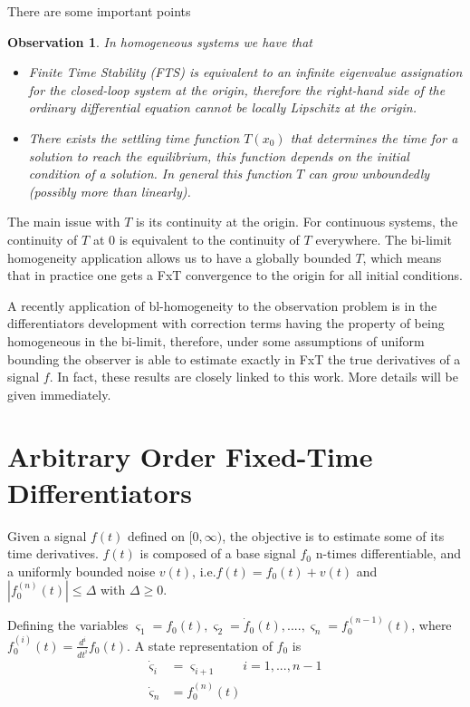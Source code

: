\documentclass[11pt,letterpaper,twoside,openright]{report}
\newtheorem{observation}{Observation}[chapter]
\begin{document}
There are some important points 
\begin{observation}\label{obs: Sys Homogeneous}
	In homogeneous systems we have that
\begin{itemize}
	\item Finite Time Stability (FTS) is equivalent to an infinite eigenvalue assignation for the closed-loop system at the origin, therefore the right-hand side of the ordinary differential equation cannot be locally Lipschitz at the origin.
	\item There exists the settling time function $T(x_0)$ that determines the time for a solution to reach the equilibrium, this function depends on the initial condition of a solution. In general this function $T$ can grow unboundedly (possibly more than linearly).
\end{itemize}
\end{observation}

The main issue with $T$ is its continuity at the origin. For continuous systems, the continuity of $T$ at $0$ is equivalent to the continuity of $T$ everywhere. The bi-limit homogeneity application allows us to have a globally bounded $T$, which means that in practice one gets a FxT convergence to the origin for all initial conditions.

A recently application of bl-homogeneity to the observation problem is in the differentiators development with correction terms having the property of being homogeneous in the bi-limit, therefore, under some assumptions of uniform bounding the observer is able to estimate exactly in FxT the true derivatives of a signal $f$. In fact, these results are closely linked to this work. More details will be given immediately.

\newpage
\section{Arbitrary Order Fixed-Time Differentiators}
\cite{Moreno2021} Given a signal $f(t)$ defined on $[0,\infty)$, the objective is to estimate some of its time derivatives. $f(t)$ is composed of a base signal $f_0$ n-times differentiable, and a uniformly bounded noise $v(t)$, i.e.$f(t)=f_0(t)+v(t)$ and $|f_0^{(n)}(t)|\leq \Delta$ with $\Delta \geq 0$.

Defining the variables $\varsigma_1=f_0(t), \varsigma_2=\dot{f}_0(t), .... ,\varsigma_n=f_0^{(n-1)}(t)$, where $f_0^{(i)}(t)=\frac{d^i}{dt^i}f_0(t)$. A state representation of $f_0$ is
\begin{equation}
	\begin{split}
		\dot{\varsigma}_i &= \varsigma_{i+1} \qquad i=1,...,n-1 \\
		\dot{\varsigma}_n &= f_0^{(n)}(t)
	\end{split}
\end{equation}
\end{document}
